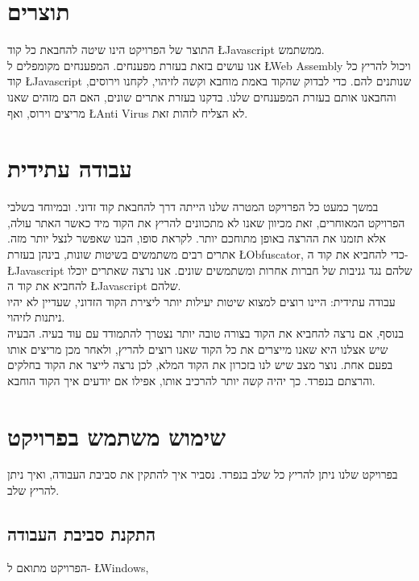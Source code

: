 \documentclass{article}
\begin{document}
	\section{תוצרים} 
	התוצר של הפרויקט הינו שיטה להחבאת כל קוד 
	\L{Javascript} 
	ממשתמש. \\ 
	אנו עושים בזאת בעזרת מפענחים. 
	המפענחים מקומפלים ל 
	\L{Web Assembly} 
	ויכול להריץ כל קוד 
	\L{Javascript} 
	שנותנים להם. 
	כדי לבדוק שהקוד באמת מוחבא וקשה לזיהוי, לקחנו וירוסים, והחבאנו אותם בעזרת המפענחים שלנו. 
	בדקנו בעזרת אתרים שונים, האם הם מזהים שאנו מריצים וירוס, ואף 
	\L{Anti Virus} 
	לא הצליח לזהות זאת. 
	
	\section{עבודה עתידית}
	במשך כמעט כל הפרויקט המטרה שלנו הייתה דרך להחבאת קוד זדוני. 
	ובמיוחד בשלבי הפרויקט המאוחרים, זאת מכיוון שאנו לא מתכוונים להריץ את הקוד מיד כאשר האתר עולה, אלא תזמנו את ההרצה באופן מתוחכם יותר. 
	לקראת סופו, הבנו שאפשר לנצל יותר מזה. 
	אתרים רבים משתמשים בשיטות שונות, בינהן בעזרת 
	\L{Obfuscator}, 
	כדי להחביא את קוד ה- 
	\L{Javascript} 
	שלהם נגד גניבות של חברות אחרות ומשתמשים שונים. 
	אנו נרצה שאתרים יוכלו להחביא את קוד ה 
	\L{Javascript} 
	שלהם. \\
	עבודה עתידית: היינו רוצים למצוא שיטות יעילות יותר ליצירת הקוד הזדוני, שעדיין לא יהיו ניתנות לזיהוי. \\
	בנוסף, אם נרצה להחביא את הקוד בצורה טובה יותר נצטרך להתמודד עם עוד בעיה. 
	הבעיה שיש אצלנו היא שאנו מייצרים את כל הקוד שאנו רוצים להריץ, ולאחר מכן מריצים אותו בפעם אחת. 
	נוצר מצב שיש לנו בזכרון את הקוד המלא, לכן נרצה לייצר את הקוד בחלקים והרצתם בנפרד. כך יהיה קשה יותר להרכיב אותו, אפילו אם יודעים איך הקוד הוחבא. 
	\section{שימוש משתמש בפרויקט}
	בפרויקט שלנו ניתן להריץ כל שלב בנפרד. 
	נסביר איך להתקין את סביבת העבודה, ואיך ניתן להריץ שלב. 
	\subsection{התקנת סביבת העבודה}
	הפרויקט מתואם ל- 
	\L{Windows}, 
	 
\end{document}
